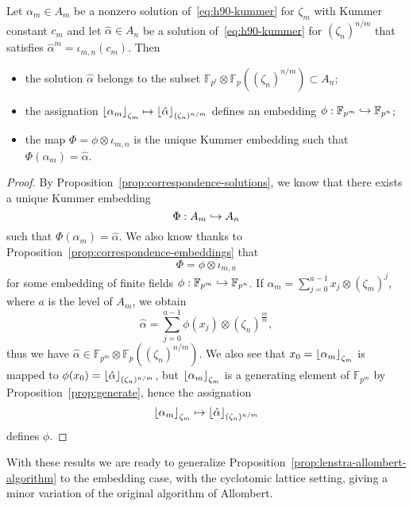 \begin{cor}
  \label{cor:link-h90-embedding}
  Let $\alpha_m\in A_m$ be a nonzero solution of~\eqref{eq:h90-kummer} for
  $\zeta_m$ with Kummer constant $c_m$ and let $\hat\alpha\in A_n$ be a solution
  of~\eqref{eq:h90-kummer} for $(\zeta_n)^{n/m}$ that satisfies
  $\hat{\alpha}^m=\iota_{m, n}(c_m)$. Then
  \begin{itemize}
    \item the solution $\hat{\alpha}$ belongs to the subset
      $\mathbb{F}_{p^{l}}\otimes\mathbb{F}_p((\zeta_n)^{n/m})\subset A_n$;
    \item the assignation
      $\left\lfloor \alpha_m \right\rfloor_{\zeta_m}\mapsto\left\lfloor \hat\alpha \right\rfloor_{(\zeta_n)^{n/m}}$
      defines an embedding $\phi:\mathbb{F}_{p^{m}}\hookrightarrow\mathbb{F}_{p^{n}}$;
    \item the map $\Phi=\phi\otimes\iota_{m, n}$ is the unique Kummer embedding
      such that $\Phi(\alpha_m)=\hat\alpha$.
  \end{itemize}
\end{cor}
\begin{proof}
  By Proposition~\ref{prop:correspondence-solutions}, we know that there exists
  a unique Kummer embedding 
  \[
    \Phi:A_m\hookrightarrow A_n
  \]
  such that $\Phi(\alpha_m) =
  \hat\alpha$. We also know thanks to
  Proposition~\ref{prop:correspondence-embeddings} that
  \[
    \Phi=\phi\otimes\iota_{m, n}
  \]
  for some embedding of finite fields
  $\phi:\mathbb{F}_{p^{m}}\hookrightarrow\mathbb{F}_{p^{n}}$. If $\alpha_m =
  \sum_{j=0}^{a-1}x_j\otimes(\zeta_m)^j$, where $a$ is the level of $A_m$, we
  obtain
  \[
    \hat\alpha = \sum_{j=0}^{a-1}\phi(x_j)\otimes(\zeta_n)^{\frac{in}{m}},
  \]
  thus we have $\hat\alpha\in\mathbb{F}_{p^{m}}\otimes\mathbb{F}_{p}(
  (\zeta_n)^{n/m})$. We also see that $x_0=\left\lfloor \alpha_m \right\rfloor_{\zeta_m}$ is mapped
  to $\phi(x_0) = \left\lfloor \hat\alpha \right\rfloor_{(\zeta_n)^{n/m}}$, but
  $\left\lfloor \alpha_m \right\rfloor_{\zeta_m}$ is a generating element of
  $\mathbb{F}_{p^{m}}$ by Proposition~\ref{prop:generate}, hence the assignation
  \[
    \left\lfloor \alpha_m \right\rfloor_{\zeta_m}\mapsto\left\lfloor \hat\alpha \right\rfloor_{(\zeta_n)^{n/m}}
  \]
  defines $\phi$.
\end{proof}
With these results we are ready to generalize
Proposition~\ref{prop:lenstra-allombert-algorithm} to the embedding case, with
the cyclotomic lattice setting, giving a minor variation of the original
algorithm of Allombert.
